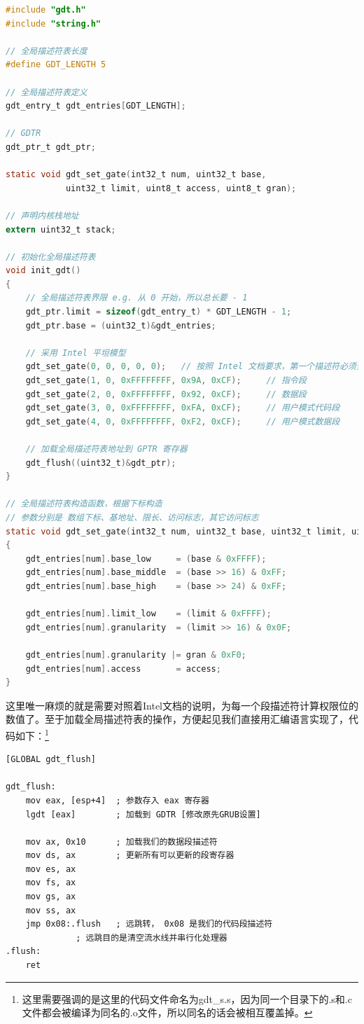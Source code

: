 \begin{lstlisting}[language = C, caption = gdt/gdt.c]
#include "gdt.h"
#include "string.h"

// 全局描述符表长度
#define GDT_LENGTH 5

// 全局描述符表定义
gdt_entry_t gdt_entries[GDT_LENGTH];

// GDTR
gdt_ptr_t gdt_ptr;

static void gdt_set_gate(int32_t num, uint32_t base,
			uint32_t limit, uint8_t access, uint8_t gran);

// 声明内核栈地址
extern uint32_t stack;

// 初始化全局描述符表
void init_gdt()
{
	// 全局描述符表界限 e.g. 从 0 开始，所以总长要 - 1
	gdt_ptr.limit = sizeof(gdt_entry_t) * GDT_LENGTH - 1;
	gdt_ptr.base = (uint32_t)&gdt_entries;

	// 采用 Intel 平坦模型
	gdt_set_gate(0, 0, 0, 0, 0);   // 按照 Intel 文档要求，第一个描述符必须全 0
	gdt_set_gate(1, 0, 0xFFFFFFFF, 0x9A, 0xCF); 	// 指令段
	gdt_set_gate(2, 0, 0xFFFFFFFF, 0x92, 0xCF); 	// 数据段
	gdt_set_gate(3, 0, 0xFFFFFFFF, 0xFA, 0xCF); 	// 用户模式代码段
	gdt_set_gate(4, 0, 0xFFFFFFFF, 0xF2, 0xCF); 	// 用户模式数据段

	// 加载全局描述符表地址到 GPTR 寄存器
	gdt_flush((uint32_t)&gdt_ptr);
}

// 全局描述符表构造函数，根据下标构造
// 参数分别是 数组下标、基地址、限长、访问标志，其它访问标志
static void gdt_set_gate(int32_t num, uint32_t base, uint32_t limit, uint8_t access, uint8_t gran)
{
	gdt_entries[num].base_low     = (base & 0xFFFF);
	gdt_entries[num].base_middle  = (base >> 16) & 0xFF;
	gdt_entries[num].base_high    = (base >> 24) & 0xFF;

	gdt_entries[num].limit_low    = (limit & 0xFFFF);
	gdt_entries[num].granularity  = (limit >> 16) & 0x0F;

	gdt_entries[num].granularity |= gran & 0xF0;
	gdt_entries[num].access       = access;
}

\end{lstlisting}

\par 这里唯一麻烦的就是需要对照着Intel文档的说明，为每一个段描述符计算权限位的数值了。至于加载全局描述符表的操作，方便起见我们直接用汇编语言实现了，代码如下：\footnote{这里需要强调的是这里的代码文件命名为gdt\_s.s，因为同一个目录下的.s和.c文件都会被编译为同名的.o文件，所以同名的话会被相互覆盖掉。}

\begin{lstlisting}[language = {[x86masm]Assembler}, caption = gdt/gdt\_s.s]
[GLOBAL gdt_flush]

gdt_flush:
	mov eax, [esp+4]  ; 参数存入 eax 寄存器
	lgdt [eax]        ; 加载到 GDTR [修改原先GRUB设置]

	mov ax, 0x10      ; 加载我们的数据段描述符
	mov ds, ax        ; 更新所有可以更新的段寄存器
	mov es, ax
	mov fs, ax
	mov gs, ax
	mov ss, ax
	jmp 0x08:.flush   ; 远跳转， 0x08 是我们的代码段描述符
			  ; 远跳目的是清空流水线并串行化处理器
.flush:
	ret
\end{lstlisting}

